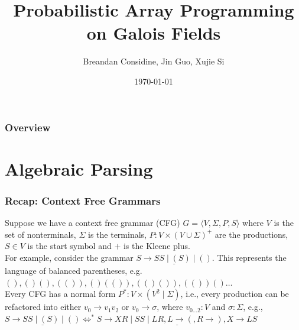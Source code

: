 \documentclass{beamer}
\title[Array Programming on $GF(2^n)$]{Probabilistic Array Programming on Galois Fields}
\author[Considine, Guo, Si]{Breandan Considine, Jin Guo, Xujie Si}
\institute[McGill]{
    McGill University, Mila IQIA\\
    \medskip
    \textit{breandan.considine@mail.mcgill.ca}
}
\date{\today}
\begin{document}
    \begin{frame}
        \titlepage
    \end{frame}

    \begin{frame}
        \frametitle{Overview}
        \tableofcontents
    \end{frame}

    \section{Algebraic Parsing}\label{sec:algebraic-parsing}


    \begin{frame}
        \frametitle{Recap: Context Free Grammars}
        Suppose we have a context free grammar (CFG) $G = \langle V, \Sigma, P, S\rangle$ where $V$ is the set of nonterminals, $\Sigma$ is the terminals, $P: V\times (V \cup \Sigma)^+$ are the productions, $S\in V$ is the start symbol and $+$ is the Kleene plus.\newline\\
        For example, consider the grammar $\underline{S \rightarrow S S \mid ( S ) \mid ()}$. This represents the language of balanced parentheses, e.g. $(), ()(), (()), ()(()), (()()), (())()\ldots$\newline\\
        Every CFG has a normal form $P^*: V \times (V^2 \mid \Sigma)$, i.e., every production can be refactored into either $v_0 \rightarrow v_1 v_2$ or $v_0 \rightarrow \sigma$, where $v_{0\ldots2}: V$ and $\sigma: \Sigma$, e.g., $\underline{S \rightarrow S S \mid ( S ) \mid ()}\Leftrightarrow^*\underline{S\rightarrow XR \mid SS \mid LR, L \rightarrow (, R \rightarrow ), X\rightarrow LS}$


\end{frame}
\end{document}
